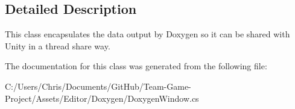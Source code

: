 \subsection{Detailed Description}
This class encapsulates the data output by Doxygen so it can be shared with Unity in a thread share way. 



The documentation for this class was generated from the following file\+:\begin{DoxyCompactItemize}
\item 
C\+:/\+Users/\+Chris/\+Documents/\+Git\+Hub/\+Team-\/\+Game-\/\+Project/\+Assets/\+Editor/\+Doxygen/Doxygen\+Window.\+cs\end{DoxyCompactItemize}
